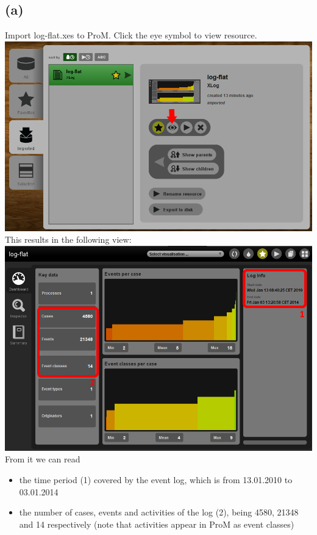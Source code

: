 \documentclass[../../main.tex]{subfiles}
\begin{document}
\subsection*{(a)}
Import log-flat.xes to ProM. 
Click the eye symbol to view resource. \\
\includegraphics[scale=0.8]{img/ProM_a_overview.png}\\
This results in the following view:\\
\includegraphics[scale=0.8]{img/ProM_a_overview_2.png}\\
From it we can read 
\begin{itemize}
\item the time period (1) covered by the event log, which is from 13.01.2010 to 03.01.2014
\item the number of cases, events and activities of the log (2), being 4580, 21348 and 14 respectively (note that activities appear in ProM as event classes)
\end{itemize}
\end{document}
